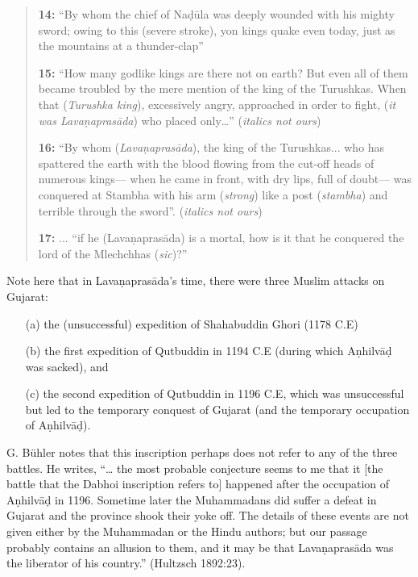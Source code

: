 \begin{quote}
\smallskip
{\bf 14:} “By whom the chief of Naḍūla was deeply wounded with his mighty sword; owing to this (severe stroke), yon kings quake even today, just as the mountains at a thunder-clap”

\smallskip
{\bf 15:} “How many godlike kings are there not on earth? But even all of them became troubled by the mere mention of the king of the Turushkas. When that ({\sl Turushka king}), excessively angry, approached in order to fight, ({\sl it was Lavaṇaprasāda}) who placed only…” ({\sl italics not ours})

\smallskip
{\bf 16:} “By whom ({\sl Lavaṇaprasāda}), the king of the Turushkas... who has spattered the earth with the blood flowing from the cut-off heads of numerous kings— when he came in front, with dry lips, full of doubt— was conquered at Stambha with his arm ({\sl strong}) like a post ({\sl stambha}) and terrible through the sword”. ({\sl italics not ours})

\smallskip
{\bf 17:} ... “if he (Lavaṇaprasāda) is a mortal, how is it that he conquered the lord of the Mlechchhas ({\sl sic})?”
\end{quote}

\smallskip
Note here that in Lavaṇaprasāda’s time, there were three Muslim attacks on Gujarat: 
\begin{itemize}
\itemsep=0pt
\item[(a)] the (unsuccessful) expedition of Shahabuddin Ghori  (1178 C.E) 
\item[(b)] the first expedition of Qutbuddin in 1194 C.E (during which Aṇhilvāḍ was sacked), and 
\item[(c)] the second expedition of Qutbuddin in 1196 C.E, which was unsuccessful but led to the temporary conquest of Gujarat (and the temporary occupation of Aṇhilvāḍ). 
\end{itemize}
G. Bühler notes that this inscription perhaps does not refer to any of the three battles. He writes, “… the most probable conjecture seems to me that it [the battle that the Dabhoi inscription refers to] happened after the occupation of Aṇhilvāḍ in 1196. Sometime later the Muhammadans did suffer a defeat in Gujarat and the province shook their yoke off. The details of these events are not given either by the Muhammadan or the Hindu authors; but our passage probably contains an allusion to them, and it may be that Lavaṇaprasāda was the liberator of his country.” (Hultzsch 1892:23). 

